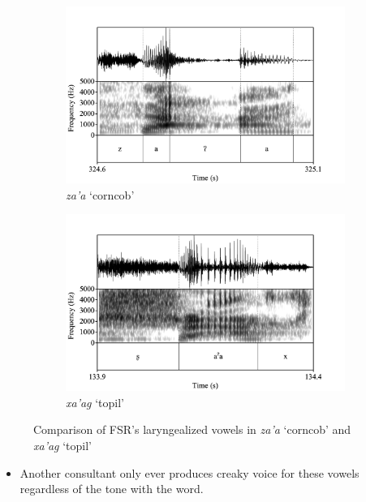 \documentclass[12pt, letterpaper]{article}
\begin{document}
\begin{figure}[!h]
	\centering
	\begin{subfigure}{.5\textwidth}
		\centering
		\includegraphics[width=\linewidth]{../za'a.png}
		\caption{\textit{za'a} `corncob'}
		\label{fig:za'a}
	\end{subfigure}%
	\begin{subfigure}{.5\textwidth}
		\centering
		\includegraphics[width=\linewidth]{../xa'ag.png}
		\caption{\textit{xa'ag} `topil'}
		\label{fig:xa'ag}
	\end{subfigure}	
	\caption{Comparison of FSR's laryngealized vowels in \textit{za'a} `corncob' and \textit{xa'ag} `topil'}
	\label{fig:FSRLaryngeal}
\end{figure}

\begin{itemize}
	\item Another consultant only ever produces creaky voice for these vowels regardless of the tone with the word.
\end{itemize}
\end{document}
